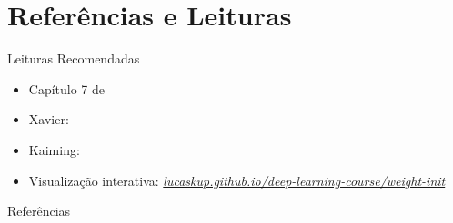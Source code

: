 \documentclass[aspectratio=169,xcolor=dvipsnames]{beamer}
\begin{document}
  \section*{Referências e Leituras}
  \begin{frame}{Leituras Recomendadas}
    \leiturasize
    \sloppy
    \begin{itemize}
      \item Capítulo 7 de 
      \item Xavier: 
      \item Kaiming: 
      \item Visualização interativa:
        \href{https://lucaskup.github.io/deep-learning-course/weight-init/}{%
          \textit{lucaskup.github.io/deep-learning-course/weight-init}}
    \end{itemize}
  \end{frame}

  \begin{frame}[allowframebreaks]{Referências}
    \sloppy
    \printbibliography[heading=none]
  \end{frame}
\end{document}
